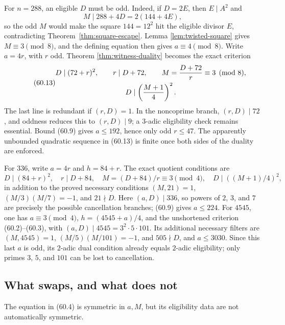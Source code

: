 \documentclass[10pt,reqno]{amsart}
\theoremstyle{definition}
\newcommand{\1}{\mathbf 1}
\begin{document}
For $n=288$, an eligible $D$ must be odd.  Indeed, if $D=2E$, then
$E\mid A^2$ and
\[
 M\mid288+4D=2(144+4E),
\]
so the odd $M$ would make the square $144=12^2$ hit the eligible divisor
$E$, contradicting Theorem~\ref{thm:square-escape}.  Lemma
\ref{lem:twisted-square} gives $M\equiv3\pmod8$, and the defining equation
then gives $a\equiv4\pmod8$.  Write $a=4r$, with $r$ odd.  Theorem
\ref{thm:witness-duality} becomes the exact criterion
\begin{equation}\tag{60.13}
 \begin{gathered}
 D\mid(72+r)^2,\qquad r\mid D+72,\qquad
 M={D+72\over r}\equiv3\pmod8,\\
 D\mid\left({M+1\over4}\right)^2.
 \end{gathered}
\end{equation}
The last line is redundant if $(r,D)=1$.  In the noncoprime branch,
$(r,D)\mid72$, and oddness reduces this to $(r,D)\mid9$; a $3$-adic
eligibility check remains essential.  Bound (60.9) gives $a\leq192$, hence
only odd $r\leq47$.  The apparently unbounded quadratic sequence in
(60.13) is finite once both sides of the duality are enforced.

For $336$, write $a=4r$ and $h=84+r$.  The exact quotient conditions are
\begin{equation}\tag{60.13a}
 D\mid(84+r)^2,\quad r\mid D+84,\quad
 M=(D+84)/r\equiv3\pmod4,\quad
 D\mid((M+1)/4)^2,
\end{equation}
in addition to the proved necessary conditions $(M,21)=1$,
$(M/3)(M/7)=-1$, and $21\nmid D$.  Here $(a,D)\mid336$, so powers of $2$,
$3$, and $7$ are precisely the possible cancellation branches; (60.9)
gives $a\leq224$.  For $4545$, one has $a\equiv3\pmod4$,
$h=(4545+a)/4$, and the unshortened criterion (60.2)--(60.3), with
$(a,D)\mid4545=3^2\cdot5\cdot101$.  Its additional necessary filters are
$(M,4545)=1$, $(M/5)(M/101)=-1$, and $505\nmid D$, and $a\leq3030$.  Since
this last $a$ is odd, its $2$-adic dual condition already equals $2$-adic
eligibility; only primes $3$, $5$, and $101$ can be lost to cancellation.

\subsection{What swaps, and what does not}
The equation in (60.4) is symmetric in $a,M$, but its eligibility data are
not automatically symmetric.
\end{document}
